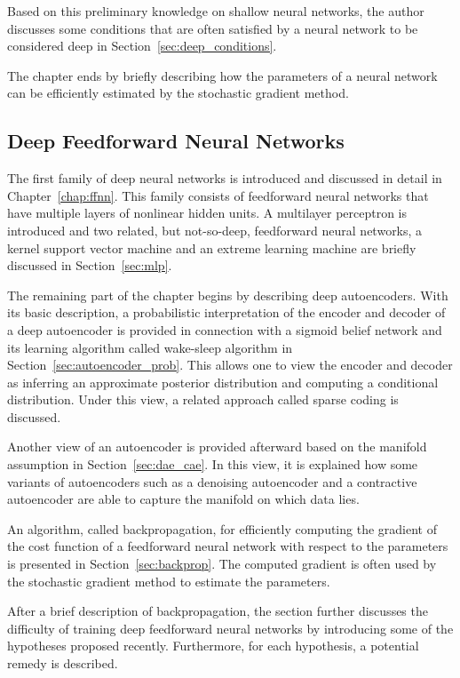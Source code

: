 \documentclass{now}
\begin{document}
Based on this preliminary knowledge on shallow neural networks, the author
discusses some conditions that are often satisfied by a neural network to be
considered deep in Section~\ref{sec:deep_conditions}. 

The chapter ends by briefly describing how the parameters of a neural network
can be efficiently estimated by the stochastic gradient method.

\subsection{Deep Feedforward Neural Networks}

The first family of deep neural networks is introduced and discussed in detail
in Chapter~\ref{chap:ffnn}. This family consists of feedforward neural networks
that have multiple layers of nonlinear hidden units.  A multilayer perceptron
is introduced and two related, but not-so-deep, feedforward neural networks, a
kernel support vector machine and an extreme learning machine are briefly
discussed in Section~\ref{sec:mlp}.

The remaining part of the chapter begins by describing deep autoencoders. With
its basic description, a probabilistic interpretation of the encoder and
decoder of a deep autoencoder is provided in connection with a sigmoid belief
network and its learning algorithm called wake-sleep algorithm in
Section~\ref{sec:autoencoder_prob}. This allows one to view the encoder and
decoder as inferring an approximate posterior distribution and computing a
conditional distribution. Under this view, a related approach called sparse
coding is discussed.

Another view of an autoencoder is provided afterward based on the manifold
assumption in Section~\ref{sec:dae_cae}. In this view, it is explained how some
variants of autoencoders such as a denoising autoencoder and a contractive
autoencoder are able to capture the manifold on which data lies. 

An algorithm, called backpropagation, for efficiently computing the gradient of
the cost function of a feedforward neural network with respect to the
parameters is presented in Section~\ref{sec:backprop}. The computed gradient is
often used by the stochastic gradient method to estimate the parameters.

After a brief description of backpropagation, the section further discusses the
difficulty of training deep feedforward neural networks by introducing some of
the hypotheses proposed recently.  Furthermore, for each hypothesis, a
potential remedy is described.
\end{document}
